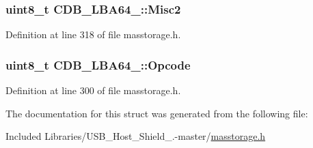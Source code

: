 \hypertarget{struct_c_d_b___l_b_a64__16_a9a71353cc6ecb838dfd560a3c985e4a6}{
\subsubsection[{\-Misc2}]{\setlength{\rightskip}{0pt plus 5cm}uint8\-\_\-t {\bf \-C\-D\-B\-\_\-\-L\-B\-A64\-\_\-::\-Misc2}}}\label{struct_c_d_b___l_b_a64__16_a9a71353cc6ecb838dfd560a3c985e4a6}


\-Definition at line 318 of file masstorage.\-h.

\hypertarget{struct_c_d_b___l_b_a64__16_a20868e9b945a51e146af8a31cad92977}{
\subsubsection[{\-Opcode}]{\setlength{\rightskip}{0pt plus 5cm}uint8\-\_\-t {\bf \-C\-D\-B\-\_\-\-L\-B\-A64\-\_\-::\-Opcode}}}\label{struct_c_d_b___l_b_a64__16_a20868e9b945a51e146af8a31cad92977}


\-Definition at line 300 of file masstorage.\-h.



\-The documentation for this struct was generated from the following file\-:\begin{DoxyCompactItemize}
\item 
\-Included Libraries/\-U\-S\-B\-\_\-\-Host\-\_\-\-Shield\-\_.-\/master/\hyperlink{masstorage_8h}{masstorage.\-h}\end{DoxyCompactItemize}
